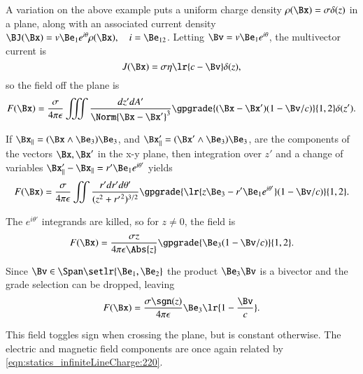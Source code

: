 %
%
A variation on the above example puts a uniform charge density \( \rho(\Bx) = \sigma \delta(z) \) in a plane, along with an associated current density \( \BJ(\Bx) = v \Be_1 e^{i\theta} \rho(\Bx), \quad i = \Be_{12} \).  Letting \( \Bv = v \Be_1 e^{i\theta} \), the multivector current is
\begin{dmath}\label{eqn:statics_infinitePlane:240}
J(\Bx) = \sigma \eta \lr{ c - \Bv } \delta(z),
\end{dmath}
so the field off the plane is
\begin{dmath}\label{eqn:statics_infinitePlane:260}
F(\Bx)
=
\frac{\sigma}{4 \pi \epsilon } \iiint \frac{dz' dA'}{ \Norm{ \Bx - \Bx' }^3 }
\gpgrade{ (\Bx - \Bx') (1 - \Bv/c) }{1,2} \delta(z').
\end{dmath}

If \( \Bx_\parallel = (\Bx \wedge \Be_3) \Be_3 \), and \( \Bx'_\parallel = (\Bx' \wedge \Be_3) \Be_3 \), are the components of the vectors \( \Bx, \Bx' \) in the x-y plane, then integration over \( z' \) and a change of variables \( \Bx'_\parallel - \Bx_\parallel = r' \Be_1 e^{i \theta'} \) yields
\begin{dmath}\label{eqn:statics_infinitePlane:280}
F(\Bx)
=
\frac{\sigma}{4 \pi \epsilon } \iint \frac{r' dr' d\theta'}{ ( z^2 + {r'}^2 )^{3/2} }
\gpgrade{ \lr{ z \Be_3 - r' \Be_1 e^{i\theta'} } (1 - \Bv/c) }{1,2}.
\end{dmath}

The \( e^{i\theta'} \) integrands are killed, so for \( z \ne 0 \), the field is
\begin{dmath}\label{eqn:statics_infinitePlane:300}
F(\Bx)
=
\frac{\sigma z}{4 \pi \epsilon \Abs{z} } \gpgrade{ \Be_3 (1 - \Bv/c) }{1,2}.
\end{dmath}

Since \( \Bv \in \Span \setlr{ \Be_1, \Be_2 } \) the product \( \Be_3 \Bv \) is a bivector and the grade selection can be dropped, leaving
\begin{dmath}\label{eqn:statics_infinitePlane:320}
F(\Bx)
=
\frac{\sigma \sgn(z)}{4 \pi \epsilon } \Be_3 \lr{ 1 - \frac{\Bv}{c}}.
\end{dmath}

This field toggles sign when crossing the plane, but is constant otherwise.  The electric and magnetic field components are once again related by \cref{eqn:statics_infiniteLineCharge:220}.


